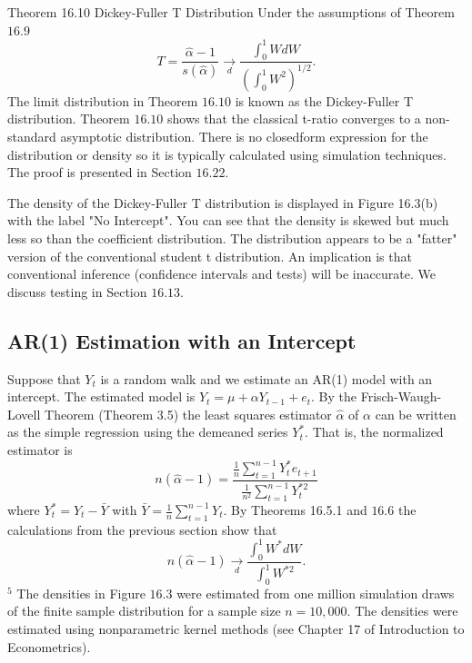 \documentclass[10pt]{article}
\begin{document}
Theorem 16.10 Dickey-Fuller T Distribution Under the assumptions of Theorem $16.9$
$$
T=\frac{\widehat{\alpha}-1}{s(\widehat{\alpha})} \underset{d}{\longrightarrow} \frac{\int_{0}^{1} W d W}{\left(\int_{0}^{1} W^{2}\right)^{1 / 2}} .
$$
The limit distribution in Theorem $16.10$ is known as the Dickey-Fuller T distribution. Theorem $16.10$ shows that the classical t-ratio converges to a non-standard asymptotic distribution. There is no closedform expression for the distribution or density so it is typically calculated using simulation techniques. The proof is presented in Section $16.22$.

The density of the Dickey-Fuller T distribution is displayed in Figure 16.3(b) with the label "No Intercept". You can see that the density is skewed but much less so than the coefficient distribution. The distribution appears to be a "fatter" version of the conventional student t distribution. An implication is that conventional inference (confidence intervals and tests) will be inaccurate. We discuss testing in Section $16.13$.

\subsection{AR(1) Estimation with an Intercept}
Suppose that $Y_{t}$ is a random walk and we estimate an AR(1) model with an intercept. The estimated model is $Y_{t}=\mu+\alpha Y_{t-1}+e_{t}$. By the Frisch-Waugh-Lovell Theorem (Theorem 3.5) the least squares estimator $\widehat{\alpha}$ of $\alpha$ can be written as the simple regression using the demeaned series $Y_{t}^{*}$. That is, the normalized estimator is
$$
n(\widehat{\alpha}-1)=\frac{\frac{1}{n} \sum_{t=1}^{n-1} Y_{t}^{*} e_{t+1}}{\frac{1}{n^{2}} \sum_{t=1}^{n-1} Y_{t}^{* 2}}
$$
where $Y_{t}^{*}=Y_{t}-\bar{Y}$ with $\bar{Y}=\frac{1}{n} \sum_{t=1}^{n-1} Y_{t}$. By Theorems 16.5.1 and $16.6$ the calculations from the previous section show that
$$
n(\widehat{\alpha}-1) \underset{d}{\longrightarrow} \frac{\int_{0}^{1} W^{*} d W}{\int_{0}^{1} W^{* 2}} .
$$
${ }^{5}$ The densities in Figure $16.3$ were estimated from one million simulation draws of the finite sample distribution for a sample size $n=10,000$. The densities were estimated using nonparametric kernel methods (see Chapter 17 of Introduction to Econometrics).
\end{document}

